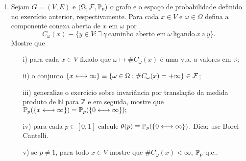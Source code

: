 \begin{enumerate}[leftmargin=*]
\item
Sejam $G=(V,E)$ e  $(\Omega,\F,\P_p)$ o grafo e o espaço de probabilidade 
definido no exercício anterior, respectivamente.
Para cada $x\in V$ e $\omega\in \Omega$ 
defina a componente conexa aberta de $x$ em $\omega$ por 
\[
C_{\omega}(x) \equiv 
\{y\in V: 
\exists\ \gamma \ \text{caminho aberto em}\ \omega \ \text{ligando}\
x\ \text{a}\ y\}.
\]
Mostre que 
\begin{itemize}
\item[i)] para cada $x\in V$ fixado que 
$\omega\mapsto \#C_{\omega}(x)$ é uma 
v.a. a valores em $\overline{\mathbb{R}}$;

\item[ii)]
o conjunto 
$
\{x \longleftrightarrow \infty\} 
\equiv 
\{\omega\in\Omega: \#C_{\omega}(x)=+\infty\}\in \F
$;


\item[iii)] generalize o exercício sobre invariância por translação da medida 
produto de $\mathbb{N}$ para $\mathbb{Z}$ e em seguida, mostre que 
$
\P_p(\{x \longleftrightarrow \infty\})
=
\P_p(\{0 \longleftrightarrow \infty\});
$

  
\item[iv)] para cada $p\in [0,1]$ 
calcule $\theta(p)\equiv\P_p(\{0 \longleftrightarrow \infty\})$.
Dica: use Borel-Cantelli.

\item[v)]
se $p\neq 1$, para todo $x\in V$ mostre que 
$\#C_{\omega}(x)<\infty$, $\P_p$-q.c.. 
\end{itemize}
\end{enumerate}